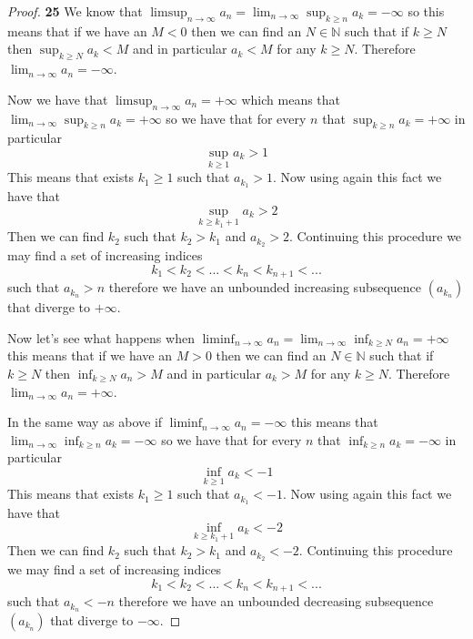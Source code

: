 \documentclass[11pt]{article}
\newcommand{\N}{\mathbb{N}}
\theoremstyle{definition}
\begin{document}
    \begin{proof}{\textbf{25}}        
        We know that
        $\limsup_{n \to \infty} a_n = \lim_{n \to \infty} \sup_{k \geq n} a_k = -\infty$
        so this means that if we have an $M < 0$ then we can find an $N \in \N$
        such that if $k \geq N$ then $\sup_{k \geq N} a_k < M$ and in particular
        $a_k < M$ for any $k \geq N$. Therefore $\lim_{n \to \infty} a_n = -\infty$.

        Now we have that $\limsup_{n \to \infty} a_n = +\infty$ which means that \\
        $\lim_{n \to \infty}\sup_{k\geq n} a_k = +\infty$ so we have that for every $n$
        that $\sup_{k\geq n} a_k = +\infty$ in particular
        $$\sup_{k\geq 1} a_k > 1$$
        This means that exists $k_1 \geq 1$ such that $a_{k_1} > 1$. Now using
        again this fact we have that
        $$\sup_{k\geq k_1 + 1} a_k > 2$$ 
        Then we can find $k_2$ such that $k_2 > k_1$ and $a_{k_2} > 2$. Continuing this
        procedure we may find a set of increasing indices
        $$k_1 < k_2 < ... < k_n < k_{n+1} < ...$$
        such that $a_{k_n} > n$ therefore we have an unbounded increasing subsequence
        $(a_{k_n})$ that diverge to $+\infty$.

        Now let's see what happens when
        $\liminf_{n \to \infty} a_n = \lim_{n \to \infty}\inf_{k\geq N} a_n = +\infty$
        this means that if we have an $M>0$ then we can find an $N \in \N$ such that
        if $k\geq N$ then $\inf_{k\geq N} a_n > M$ and in particular $a_k > M$ for any
        $k \geq N$. Therefore $\lim_{n \to \infty} a_n = +\infty$.

        In the same way as above if $\liminf_{n \to \infty} a_n = -\infty$ this means
        that $\lim_{n \to \infty}\inf_{k\geq n} a_k = -\infty$ so we have that for every
        $n$ that $\inf_{k\geq n} a_k = -\infty$ in particular
        $$\inf_{k\geq 1} a_k < -1$$
        This means that exists $k_1 \geq 1$ such that $a_{k_1} < -1$. Now using
        again this fact we have that
        $$\inf_{k\geq k_1 + 1} a_k < -2$$ 
        Then we can find $k_2$ such that $k_2 > k_1$ and $a_{k_2} < -2$. Continuing this
        procedure we may find a set of increasing indices
        $$k_1 < k_2 < ... < k_n < k_{n+1} < ...$$
        such that $a_{k_n} < -n$ therefore we have an unbounded decreasing subsequence
        $(a_{k_n})$ that diverge to $-\infty$.

    \end{proof}
\cleardoublepage
\end{document}
